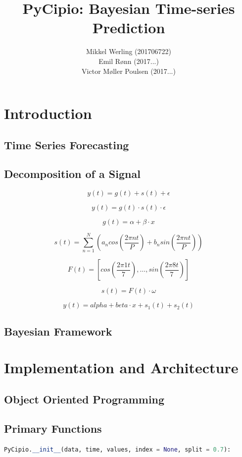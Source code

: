 \documentclass{article}
\title{PyCipio: Bayesian Time-series Prediction}
\author{Mikkel Werling (201706722) \\
    Emil Rønn (2017...) \\
    Victor Møller Poulsen (2017...)}
\date{}
\begin{document}
\maketitle
\section{Introduction}
\subsection{Time Series Forecasting}
\subsection{Decomposition of a Signal}

$$y(t) = g(t) + s(t) + \epsilon$$

$$y(t) = g(t) \cdot s(t) \cdot \epsilon $$

$$g(t) = \alpha + \beta \cdot x$$

$$s(t) = \sum _{n=1} ^N \left( a_n cos(\frac{2 \pi n t}{P}) + b_n sin(\frac{2 \pi n t}{P}) \right)$$

$$F(t) = \left[ cos(\frac{2 \pi 1 t}{7}), \dots, sin(\frac{2 \pi 8 t}{7}) \right]$$

$$s(t) = F(t) \cdot \omega$$

$$y(t) = alpha + beta \cdot x + s_1(t) + s_2(t)$$

\subsection{Bayesian Framework}

\section{Implementation and Architecture}

\subsection{Object Oriented Programming}

\subsection{Primary Functions}

\begin{lstlisting}[language=Python]
PyCipio.__init__(data, time, values, index = None, split = 0.7):
\end{lstlisting}
\end{document}
